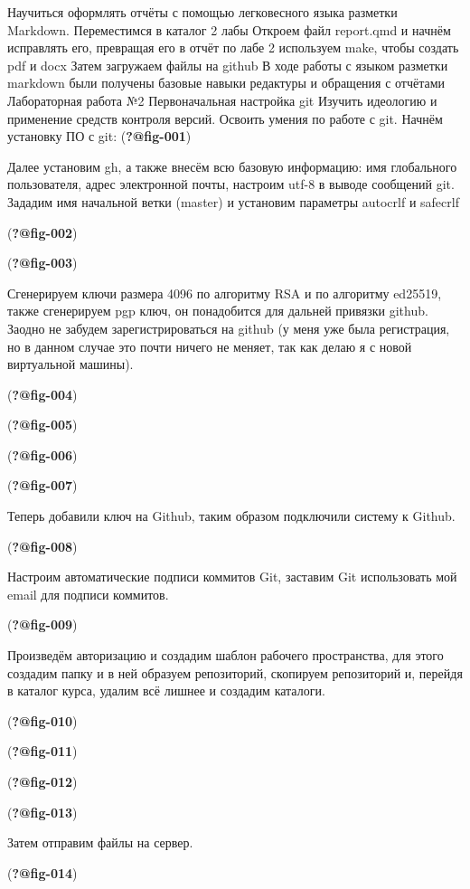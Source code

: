 \documentclass[
  english,
  russian,
  12pt,
  a4paper,
  DIV=11,
  numbers=noendperiod]{scrreprt}
\begin{document}
Научиться оформлять отчёты с помощью легковесного языка разметки
Markdown. Переместимся в каталог 2 лабы Откроем файл report.qmd и начнём
исправлять его, превращая его в отчёт по лабе 2 используем make, чтобы
создать pdf и docx Затем загружаем файлы на github В ходе работы с
языком разметки markdown были получены базовые навыки редактуры и
обращения с отчётами Лабораторная работа №2 Первоначальная настройка git
Изучить идеологию и применение средств контроля версий. Освоить умения
по работе с git. Начнём установку ПО с git: (\textbf{?@fig-001})

Далее установим gh, а также внесём всю базовую информацию: имя
глобального пользователя, адрес электронной почты, настроим utf-8 в
выводе сообщений git. Зададим имя начальной ветки (master) и установим
параметры autocrlf и safecrlf

(\textbf{?@fig-002})

(\textbf{?@fig-003})

Сгенерируем ключи размера 4096 по алгоритму RSA и по алгоритму ed25519,
также сгенерируем pgp ключ, он понадобится для дальней привязки github.
Заодно не забудем зарегистрироваться на github (у меня уже была
регистрация, но в данном случае это почти ничего не меняет, так как
делаю я с новой виртуальной машины).

(\textbf{?@fig-004})

(\textbf{?@fig-005})

(\textbf{?@fig-006})

(\textbf{?@fig-007})

Теперь добавили ключ на Github, таким образом подключили систему к
Github.

(\textbf{?@fig-008})

Настроим автоматические подписи коммитов Git, заставим Git использовать
мой email для подписи коммитов.

(\textbf{?@fig-009})

Произведём авторизацию и создадим шаблон рабочего пространства, для
этого создадим папку и в ней образуем репозиторий, скопируем репозиторий
и, перейдя в каталог курса, удалим всё лишнее и создадим каталоги.

(\textbf{?@fig-010})

(\textbf{?@fig-011})

(\textbf{?@fig-012})

(\textbf{?@fig-013})

Затем отправим файлы на сервер.

(\textbf{?@fig-014})
\end{document}
